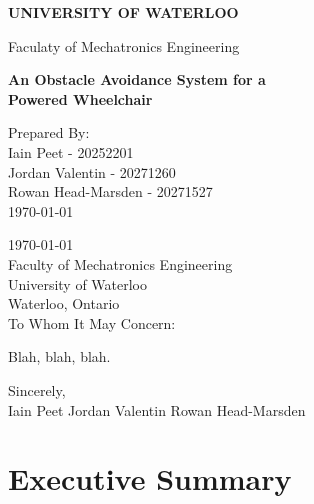 \documentclass[oneside,final,a4paper]{report}
\begin{document}
\pagestyle{empty}

\begin{flushright}
 \begin{LARGE}
  \textbf{UNIVERSITY OF WATERLOO}
 \end{LARGE}

 \begin{large}
  Faculaty of Mechatronics Engineering\\[4cm]
 \end{large}

 \begin{LARGE}
  \textbf{An Obstacle Avoidance System for a}\\
  \textbf{Powered Wheelchair}
 \end{LARGE}

 \vfill

  Prepared By: \\[0.2cm]
  Iain Peet - 20252201\\
  Jordan Valentin - 20271260\\
  Rowan Head-Marsden - 20271527\\
  \today
\end{flushright}
\clearpage

\today \\[0.5cm]

Faculty of Mechatronics Engineering \\
University of Waterloo \\
Waterloo, Ontario \\

To Whom It May Concern:

Blah, blah, blah.

Sincerely, \\[1cm]

Iain Peet \hspace{2cm} Jordan Valentin \hspace{2cm} Rowan Head-Marsden
\clearpage

\pagestyle{plain}
\setcounter{page}{1}

\setcounter{tocdepth}{1}
\tableofcontents

\listoffigures
{}

\chapter*{Executive Summary}
\end{document}
